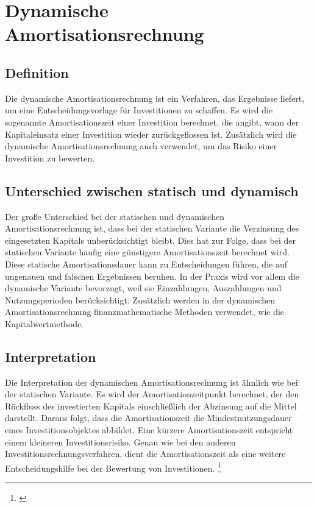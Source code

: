\chapter{Dynamische Amortisationsrechnung}
\label{Dynamische Amortisationsrechnung}

\section{Definition}
Die dynamische Amortisationsrechnung ist ein Verfahren, das Ergebnisse liefert, um eine Entscheidungsvorlage für Investitionen zu schaffen. Es wird die sogenannte Amortisationszeit einer Investition berechnet, die angibt, wann der Kapitaleinsatz einer Investition wieder zurückgeflossen ist. Zusätzlich wird die dynamische Amortisationsrechnung auch verwendet, um das Risiko einer Investition zu bewerten.

\section{Unterschied zwischen statisch und dynamisch}
Der große Unterschied bei der statischen und dynamischen Amortisationsrechnung ist, dass bei der statischen Variante die Verzinsung des eingesetzten Kapitals unberücksichtigt bleibt. Dies hat zur Folge, dass bei der statischen Variante häufig eine günstigere Amortisationszeit berechnet wird. Diese statische Amortisationsdauer kann zu Entscheidungen führen, die auf ungenauen und falschen Ergebnissen beruhen. In der Praxis wird vor allem die dynamische Variante bevorzugt, weil sie Einzahlungen, Auszahlungen und Nutzungsperioden berücksichtigt. Zusätzlich werden in der dynamischen Amortisationsrechnung finanzmathematische Methoden verwendet, wie die Kapitalwertmethode.
\newpage
\section{Interpretation}
Die Interpretation der dynamischen Amortisationsrechnung ist ähnlich wie bei der statischen Variante. Es wird der Amortisationzeitpunkt
berechnet, der den Rückfluss des investierten Kapitals einschließlich der Abzinsung auf die Mittel darstellt. Daraus folgt, dass die Amortisationszeit die Mindestnutzungsdauer eines Investitionsobjektes abbildet. Eine kürzere Amortisationszeit entspricht einem kleineren Investitionsrisiko. Genau wie bei den anderen Investitionsrechnungsverfahren, dient die Amortisationszeit als eine weitere Entscheidungshilfe bei der Bewertung von Investitionen.
\footnote{\cite{gevestor}}
